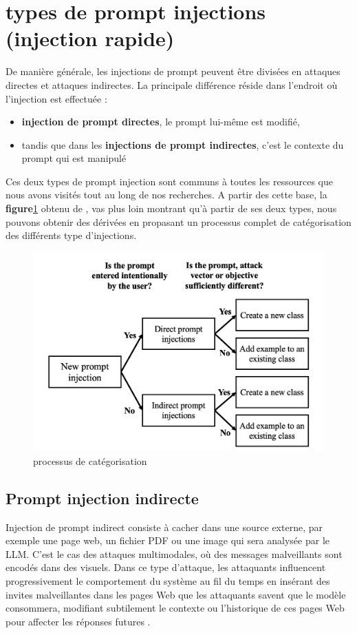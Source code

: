 \section{types de prompt injections (injection rapide)}
	De manière générale, les injections de prompt peuvent être divisées en attaques directes et attaques indirectes. La principale différence réside dans l’endroit où l’injection est effectuée :
		\begin{itemize}
		\item \textbf{injection de prompt directes}, le prompt lui-même est modifié,
		\item tandis que dans les \textbf{injections de prompt indirectes}, c’est le contexte du prompt qui est manipulé
	\end{itemize}
	Ces deux types de prompt injection sont communs à toutes les ressources que nous avons visités tout au long de nos recherches. A partir des cette base, la \textbf{figure}\ref{fig1} obtenu de \cite{rossi_early_2024}, vas plus loin montrant qu'à partir de ses deux types, nous pouvons obtenir des dérivées en propasant un processus complet de catégorisation des différents type d'injections.
	\begin{figure}[h!]
		\centering
		\includegraphics[width=0.7\linewidth]{img/process.png}
		\caption{processus de catégorisation}
		\label{fig1}
	\end{figure}
	
\subsection{Prompt injection indirecte}
Injection de prompt indirect consiste à cacher dans une source externe, par exemple une page web, un fichier PDF ou une image qui sera analysée par le LLM. C'est le cas des attaques multimodales, où des messages malveillants sont encodés dans des visuels. Dans ce type d'attaque, les attaquants influencent progressivement le comportement du système au fil du temps en insérant des invites malveillantes dans les pages Web que les attaquants savent que le modèle consommera, modifiant subtilement le contexte ou l’historique de ces pages Web pour affecter les réponses futures \cite{mathew_enhancing_nodate}.

